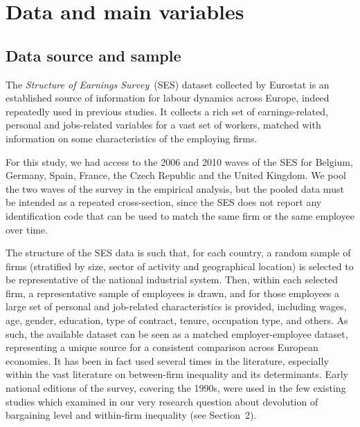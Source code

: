 \documentclass[12pt]{article}
\begin{document}
\section{Data and main variables}
\label{sec:data}

\subsection{Data source and sample}
The \emph{Structure of Earnings Survey}~(SES) dataset collected by Eurostat is an established source of information for labour dynamics across Europe, indeed repeatedly used in previous studies. It collects a rich set of earnings-related, personal and jobs-related variables for a vast set of workers, matched with information on some characteristics of the employing firms. 

For this study, we had access to the 2006 and 2010 waves of the SES for Belgium, Germany, Spain, France, the Czech Republic and the United Kingdom. We pool the two waves of the survey in the empirical analysis, but the pooled data must be intended as a repeated cross-section, since the SES does not report any identification code that can be used to match the same firm or the same employee over time.

The structure of the SES data is such that, for each country, a random sample of firms (stratified by size, sector of activity and geographical location) is selected to be representative of the national industrial system. Then, within each selected firm, a representative sample of employees is drawn, and for those employees a large set of personal and job-related characteristics is provided, including wages, age, gender, education, type of contract, tenure, occupation type, and others. As such, the available dataset can be seen as a matched employer-employee dataset, representing a unique source for a consistent comparison across European economies. It has been in fact used several times in the literature, especially within the vast literature on between-firm inequality and its determinants. Early national editions of the survey, covering the 1990s, were used in the few existing studies which examined in our very research question about devolution of bargaining level and within-firm inequality (see Section~2).
\end{document}
